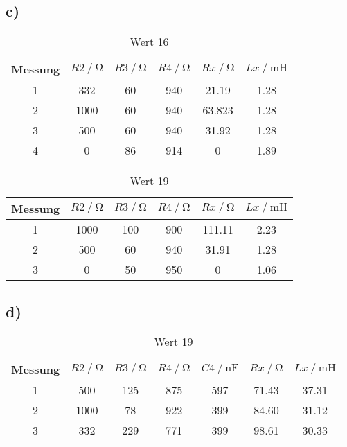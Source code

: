 \subsection{c)}

\begin{table}
    \centering
    \caption{Wert 16}
    \label{tab:}
    \begin{tabular}{c| c c c c c}
        \toprule
       {Messung} &  {$R2 \:/\: \si{\ohm} $} & {$R3 \:/\: \si{\ohm}  $} & {$R4 \:/\: \si{\ohm}  $} & {$Rx \:/\: \si{\ohm} $} &  {$Lx \:/\: \si{\milli\henry}$}\\
        \midrule
 1 & 332 & 60 & 940 & 21.19 & 1.28\\
 2 & 1000 & 60 & 940 & 63.823 & 1.28\\
 3 & 500 & 60 & 940 & 31.92 & 1.28\\
 4 & 0 & 86 & 914 & 0 & 1.89\\

      \bottomrule
    \end{tabular}
\end{table}



\begin{table}
    \centering
    \caption{Wert 19}
    \label{tab:}
    \begin{tabular}{c| c c c c c}
        \toprule
       {Messung} &  {$R2 \:/\: \si{\ohm} $} & {$R3 \:/\: \si{\ohm}  $} & {$R4 \:/\: \si{\ohm}  $} & {$Rx \:/\: \si{\ohm} $} &  {$Lx \:/\: \si{\milli\henry}$}\\
        \midrule
 1 & 1000 & 100 & 900 & 111.11 & 2.23\\
 2 & 500 & 60 & 940 & 31.91 & 1.28\\
 3 & 0 & 50 & 950 & 0 & 1.06\\

      \bottomrule
    \end{tabular}
\end{table}

\subsection{d)}

\begin{table}
    \centering
    \caption{Wert 19}
    \label{tab:}
    \begin{tabular}{c| c c c c c c}
        \toprule
       {Messung} &  {$R2 \:/\: \si{\ohm} $} & {$R3 \:/\: \si{\ohm}  $} & {$R4 \:/\: \si{\ohm}  $}& {$C4 \:/\: \si{\nano\farad}  $} & {$Rx \:/\: \si{\ohm} $} &  {$Lx \:/\: \si{\milli\henry}$}\\
        \midrule

 1 & 500 & 125 & 875 & 597 & 71.43 & 37.31\\
 2 & 1000 & 78 & 922 & 399 & 84.60 & 31.12\\
 3 & 332 & 229 & 771 & 399 & 98.61 & 30.33\\


      \bottomrule
    \end{tabular}
\end{table}

